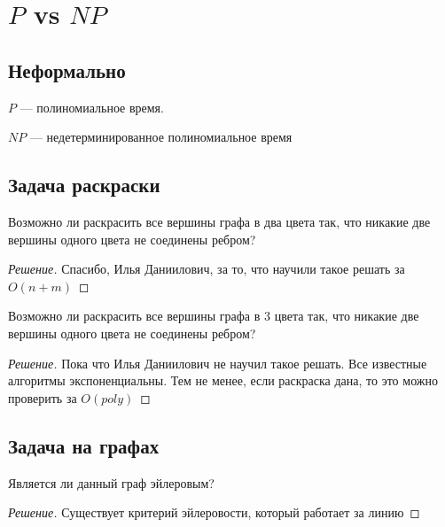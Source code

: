 
\section{\(P\) vs \(NP\)}

\subsection{Неформально}

\begin{definition}
    \(P\) --- полиномиальное время. 
\end{definition}

\begin{definition}
    \(NP\) --- недетерминированное полиномиальное время
\end{definition}

\subsection{Задача раскраски}

\begin{problem}[2-Раскраска]
    Возможно ли раскрасить все вершины графа в два цвета так, что никакие две вершины одного цвета не соединены ребром?
\end{problem}
\begin{proof}[Решение]
    Спасибо, Илья Даниилович, за то, что научили такое решать за \(O(n + m)\)
\end{proof}

\begin{problem}[3-Раскраска]
    Возможно ли раскрасить все вершины графа в 3 цвета так, что никакие две вершины одного цвета не соединены ребром?
\end{problem}
\begin{proof}[Решение]
    Пока что Илья Даниилович не научил такое решать. Все известные алгоритмы экспоненциальны. Тем не менее, если раскраска дана, то это можно проверить за \(O(poly)\)
\end{proof}

\subsection{Задача на графах}

\begin{problem}
    Является ли данный граф эйлеровым?
\end{problem}
\begin{proof}[Решение]
    Существует критерий эйлеровости, который работает за линию
\end{proof}

